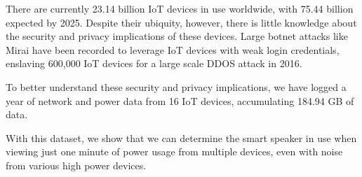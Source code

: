 There are currently 23.14 billion IoT devices in use worldwide, with 75.44 billion expected by 2025. Despite their ubiquity, however, there is little knowledge about the security and privacy implications of these devices. Large botnet attacks like Mirai have been recorded to leverage IoT devices with weak login credentials, enslaving 600,000 IoT devices for a large scale DDOS attack in 2016.

To better understand these security and privacy implications, we have logged a year of network and power data from 16 IoT devices, accumulating 184.94 GB of data.

With this dataset, we show that we can determine the smart speaker in use when viewing just one minute of power usage from multiple devices, even with noise from various high power devices.
